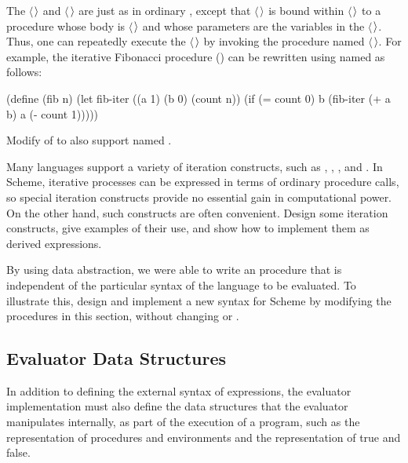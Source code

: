 \begin{exerciseGroup}
The \( \langle \)\( \kern0.08em\rangle \) and \( \langle \)\( \kern0.08em\rangle \) are just as in ordinary ,
except that \( \langle \)\( \kern0.08em\rangle \) is bound within \( \langle \)\( \kern0.08em\rangle \) to a procedure whose body
is \( \langle \)\( \kern0.08em\rangle \) and whose parameters are the variables in the \( \langle \)\( \kern0.08em\rangle \).
Thus, one can repeatedly execute the \( \langle \)\( \kern0.08em\rangle \) by invoking the procedure
named \( \langle \)\( \kern0.08em\rangle \).  For example, the iterative Fibonacci procedure
() can be rewritten using named  as follows:

\begin{codeBlock}

(define (fib n)
  (let fib-iter ((a 1)
                 (b 0)
                 (count n))
    (if (= count 0)
        b
        (fib-iter (+ a b) a (- count 1)))))
\end{codeBlock}

Modify  of  to also support named
.

\label{Exercise 4.9}
 Many languages support a variety of
iteration constructs, such as , , , and
.  In Scheme, iterative processes can be expressed in terms of
ordinary procedure calls, so special iteration constructs provide no essential
gain in computational power.  On the other hand, such constructs are often
convenient.  Design some iteration constructs, give examples of their use, and
show how to implement them as derived expressions.

\label{Exercise 4.10}
 By using data abstraction, we
were able to write an  procedure that is independent of the
particular syntax of the language to be evaluated.  To illustrate this, design
and implement a new syntax for Scheme by modifying the procedures in this
section, without changing  or .
\end{exerciseGroup}

\subsection{Evaluator Data Structures}
\label{Section 4.1.3}

In addition to defining the external syntax of expressions, the evaluator
implementation must also define the data structures that the evaluator
manipulates internally, as part of the execution of a program, such as the
representation of procedures and environments and the representation of true
and false.

